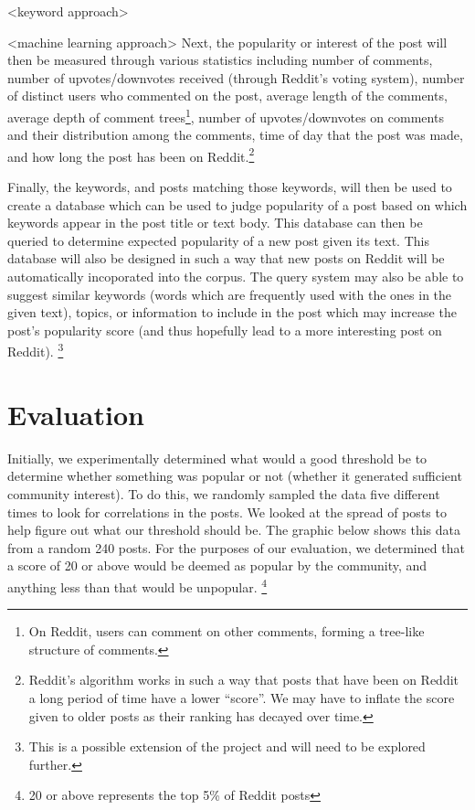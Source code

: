 \documentclass{acm_proc_article-sp}
\begin{document}
<keyword approach>

<machine learning approach>
Next, the popularity or interest of the post will then be measured through various statistics including
number of comments, number of upvotes/downvotes received (through Reddit's voting system), number
of distinct users who commented on the post, average length of the comments, average depth of
comment trees\footnote{On Reddit, users can comment on other comments, forming a tree-like structure of comments.},
number of upvotes/downvotes on comments and their distribution among the comments, time of day that the post was made,
and how long the post has been on Reddit.\footnote{Reddit's algorithm works in such a way that posts that have been on Reddit
a long period of time have a lower ``score''. We may have to inflate the score given to older posts as their ranking
has decayed over time.}

Finally, the keywords, and posts matching those keywords, will then be used to create a database which
can be used to judge popularity of a post based on which keywords appear in the post title or text
body.  This database can then be queried to determine expected popularity of a new post given its
text.  This database will also be designed in such a way that new posts on Reddit will be automatically
incoporated into the corpus.
The query system may also be able to suggest similar keywords (words which are frequently used with
the ones in the given text), topics, or information to include in the post which may increase
the post's popularity score (and thus hopefully lead to a more interesting post on Reddit).
\footnote{This is a possible extension of the project and will need to be explored further.}

\section{Evaluation}
Initially, we experimentally determined what would a good threshold be to determine whether something was popular or not (whether it generated sufficient community interest). To do this, we randomly sampled the data five different times to look for correlations in the posts. We looked at the spread of posts to help figure out what our threshold should be. The graphic below shows this data from a random 240 posts. For the purposes of our evaluation, we determined that a score of 20 or above would be deemed as popular by the community, and anything less than that would be unpopular. \footnote{20 or above represents the top 5\% of Reddit posts}
\end{document}
